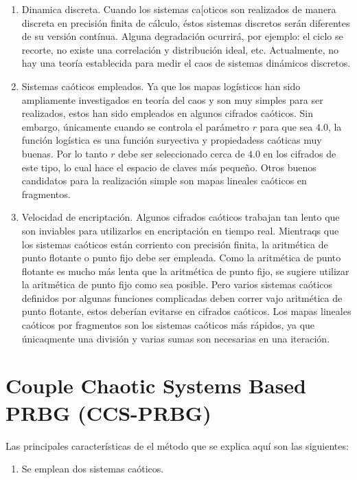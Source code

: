 \documentclass[prodmode,acmtap]{acmlarge}
\begin{document}
\begin{enumerate}
\item Dinamica discreta. Cuando  los sistemas ca[oticos son realizados de manera discreta en precisión finita de cálculo, éstos sistemas discretos serán diferentes de su versión contínua. Alguna degradación ocurrirá, por ejemplo: el ciclo se recorte, no existe una correlación y distribución ideal, etc. Actualmente, no hay una teoría establecida para medir el caos de sistemas dinámicos discretos.


\item Sistemas caóticos empleados. Ya que los mapas logísticos han sido ampliamente investigados en teoría del caos y son muy simples para ser realizados, estos han sido empleados en algunos cifrados caóticos. Sin embargo, únicamente cuando se controla el parámetro $r$ para que sea $4.0$, la función logística es una función suryectiva y propiedadess caóticas muy buenas. Por lo tanto $r$ debe ser seleccionado cerca de $4.0$ en los cifrados de este tipo, lo cual hace el espacio de claves más pequeño. Otros buenos candidatos para la realización simple son mapas lineales caóticos en fragmentos.

\item Velocidad de encriptación. Algunos cifrados caóticos trabajan tan lento que son inviables para utilizarlos en encriptación en tiempo real. Mientraqs que los sistemas caóticos están corriento con precisión finita, la aritmética de punto flotante o punto fijo debe ser empleada. Como la aritmética de punto flotante  es mucho más lenta que la aritmética de punto fijo, se sugiere utilizar la aritmética de punto fijo como sea posible. Pero varios sistemas caóticos definidos por algunas funciones complicadas  deben correr vajo aritmética de punto flotante, estos deberían evitarse en cifrados caóticos. Los mapas lineales caóticos por fragmentos son los sistemas caóticos más rápidos, ya que únicaqmente una división y varias sumas son necesarias en una iteración.  
\end{enumerate}



\section{Couple Chaotic Systems Based PRBG (CCS-PRBG)}

Las principales características de el método que se explica aquí son las siguientes:
\begin{enumerate}
\item Se emplean dos sistemas caóticos.
\end{enumerate}
\end{document}
